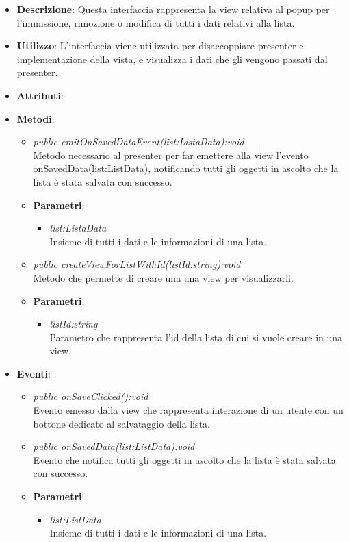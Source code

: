 \begin{itemize}
\item \textbf{Descrizione}: Questa interfaccia rappresenta la view relativa al popup per l'immissione, rimozione o modifica di tutti i dati relativi alla lista.
\item \textbf{Utilizzo}: L'interfaccia viene utilizzata per disaccoppiare presenter e implementazione della vista, e visualizza i dati che gli vengono passati dal presenter.
\item \textbf{Attributi}: 
\item \textbf{Metodi}:
	\begin{itemize}	
	\item \textit{public emitOnSavedDataEvent(list:ListaData):void}\\
	Metodo necessario al presenter per far emettere alla view l'evento onSavedData(list:ListData), notificando tutti gli oggetti in ascolto che la lista è stata salvata con successo.
			\item{\textbf{Parametri}: \begin{itemize}
			\item \textit{list:ListaData}\\
			Insieme di tutti i dati e le informazioni di una lista.
			\end{itemize}}
	\item \textit{public createViewForListWithId(listId:string):void}\\
	Metodo che permette di creare una una view per visualizzarli.
			\item{\textbf{Parametri}: \begin{itemize}
			\item \textit{listId:string}\\
			Parametro che rappresenta l'id della lista di cui si vuole creare in una view.
			\end{itemize}}
	\end{itemize}
\item \textbf{Eventi}:
	\begin{itemize}
	\item \textit{public onSaveClicked():void}\\
	Evento emesso dalla view che rappresenta interazione di un utente con un bottone dedicato al salvataggio della lista.
	\item \textit{public onSavedData(list:ListData):void}\\
			Evento che notifica tutti gli oggetti in ascolto che la lista è stata salvata con successo.
			\item{\textbf{Parametri}: \begin{itemize}
			\item \textit{list:ListData}\\
			Insieme di tutti i dati e le informazioni di una lista.
			\end{itemize}}
	\end{itemize}
\end{itemize}

